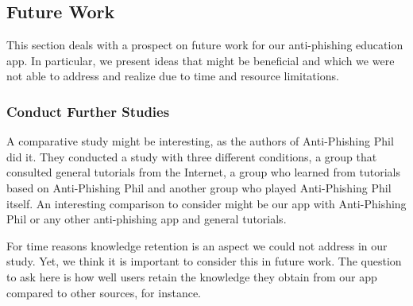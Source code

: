 \subsection{Future Work}
\label{s:future_work}
This section deals with a prospect on future work for our anti-phishing education app.
 In particular, we present ideas that might be beneficial and which we were not able to address and realize due to time and resource limitations.

\subsubsection{Conduct Further Studies}
\begin{description}[leftmargin=0cm]
	\item[Comparative Study:] A comparative study might be interesting, as the authors of Anti-Phishing Phil~\cite{sheng2007antiphishingphil} did it.
	They conducted a study with three different conditions,  a group that consulted general tutorials from the Internet, a  group who learned from tutorials based on Anti-Phishing Phil and another group who played Anti-Phishing Phil itself.
	An interesting comparison to consider might be our app with Anti-Phishing Phil or any other anti-phishing app and general tutorials.
	\item[Study on Retention:] For time reasons knowledge retention is an aspect we could not address in our study.
	Yet, we think it is important to consider this in future work.
	The question to ask here is how well users retain the knowledge they obtain from our app compared to other sources, for instance.
\end{description}

